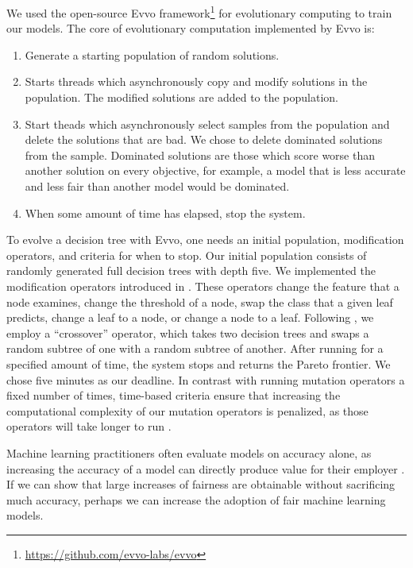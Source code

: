 \documentclass[twoside]{article}
\begin{document}
We used the open-source Evvo framework\footnote{\href{https://github.com/evvo-labs/evvo}{https://github.com/evvo-labs/evvo}} for evolutionary computing to train our models. The core of evolutionary computation implemented by Evvo is:
\begin{enumerate}
	\item Generate a starting population of random solutions.
	\item Starts threads which asynchronously copy and modify solutions in the population. The modified solutions are added to the population.
	\item Start theads which asynchronously select samples from the population and delete the solutions that are bad. We chose to delete dominated solutions from the sample. Dominated solutions are those which score worse than another solution on every objective, for example, a model that is less accurate and less fair than another model would be dominated.
	\item When some amount of time has elapsed, stop the system.
\end{enumerate}
To evolve a decision tree with Evvo, one needs an initial population, modification operators, and criteria for when to stop. Our initial population consists of randomly generated full decision trees with depth five. We implemented the modification operators introduced in \citep{Kretowski:2005}. These operators change the feature that a node examines, change the threshold of a node, swap the class that a given leaf predicts, change a leaf to a node, or change a node to a leaf. Following \citep{Papagelis:2000}, we employ a “crossover” operator, which takes two decision trees and swaps a random subtree of one with a random subtree of another. After running for a specified amount of time, the system stops and returns the Pareto frontier. We chose five minutes as our deadline. In contrast with running mutation operators a fixed number of times, time-based criteria ensure that increasing the computational complexity of our mutation operators is penalized, as those operators will take longer to run \citep{Eiben:2015}.

Machine learning practitioners often evaluate models on accuracy alone, as increasing the accuracy of a model can directly produce value for their employer \citep{Packer:2018}. If we can show that large increases of fairness are obtainable without sacrificing much accuracy, perhaps we can increase the adoption of fair machine learning models. 
\end{document}
